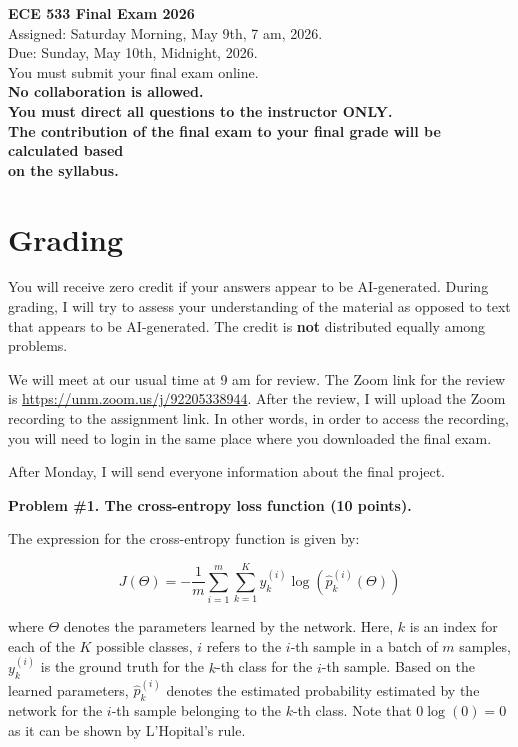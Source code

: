 \documentclass[12pt]{article}
\begin{document}
	
	\begin{center}
		{\Huge \textbf{ECE 533 Final Exam 2026}}\\
		Assigned: Saturday Morning, May 9th, 7 am, 2026.\\
		Due: Sunday, May 10th, Midnight, 2026.\\
		You must submit your final exam online.\\
		\textbf{No collaboration is allowed.}\\
		\textbf{You must direct all questions to the instructor ONLY.}\\
		\textbf{The contribution of the final exam to your final grade will be calculated based}\\
		\textbf{on the syllabus.}
	\end{center}
	
	\section{Grading}
	
	You will receive zero credit if your answers appear to be AI-generated. During grading, I
	will try to assess your understanding of the material as opposed to text that appears to be
	AI-generated. The credit is \textbf{not} distributed equally among problems.
	
	We will meet at our usual time at 9 am for review. The Zoom link for the review is
	\href{https://unm.zoom.us/j/92205338944}{https://unm.zoom.us/j/92205338944}.
	After the review, I will upload the Zoom recording to the assignment link. In other words,
	in order to access the recording, you will need to login in the same place where you
	downloaded the final exam.
	
	After Monday, I will send everyone information about the final project.
	
	\newpage
	
	\noindent\textbf{Problem \#1. The cross-entropy loss function (10 points).}
	
	\noindent The expression for the cross-entropy function is given by:
	
	\[
	J(\Theta)
	=
	-\frac{1}{m}
	\sum_{i=1}^{m}
	\sum_{k=1}^{K}
	y_k^{(i)}
	\log\left(
	\hat{p}_k^{(i)}(\Theta)
	\right)
	\]
	
	where $\Theta$ denotes the parameters learned by the network. Here, $k$ is an index for
	each of the $K$ possible classes, $i$ refers to the $i$-th sample in a batch of $m$ samples,
	$y_k^{(i)}$ is the ground truth for the $k$-th class for the $i$-th sample. Based on the
	learned parameters, $\hat{p}_k^{(i)}$ denotes the estimated probability estimated by the
	network for the $i$-th sample belonging to the $k$-th class. Note that $0\log(0)=0$ as it
	can be shown by L'Hopital's rule.
	
\end{document}
